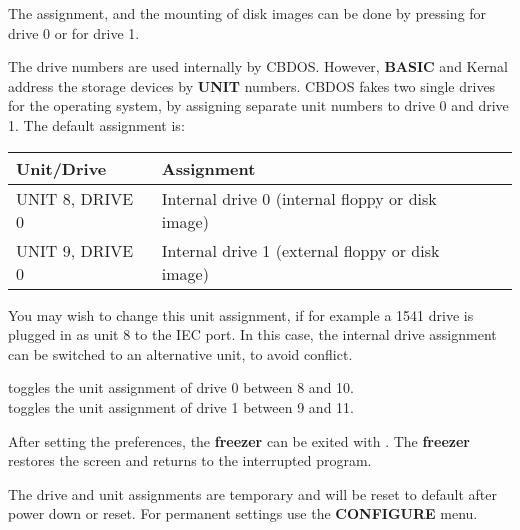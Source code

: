 The assignment, and the mounting of disk images can be done by pressing
 for drive 0 or  for drive 1.

The drive numbers are used internally by CBDOS. However, {\bf BASIC} and Kernal
address the storage devices by {\bf UNIT} numbers.
CBDOS fakes two single drives for the
operating system, by assigning separate unit numbers to drive 0 and drive 1.
The default assignment is:

\begin{center}
\begin{tabular}{|l|l|l|}
\hline
{\bf Unit/Drive} & {\bf Assignment} \\
\hline
UNIT 8, DRIVE 0  & Internal drive 0 (internal floppy or disk image) \\
UNIT 9, DRIVE 0} & Internal drive 1 (external floppy or disk image) \\
\hline
\end{tabular}
\end{center}


You may wish to change this unit assignment, if for example
a 1541 drive is plugged in as unit 8 to the IEC port.
In this case, the internal drive assignment can be switched to an alternative unit,
to avoid conflict.

 toggles the unit assignment of drive 0 between 8 and 10. \\
 toggles the unit assignment of drive 1 between 9 and 11.

After setting the preferences, the {\bf freezer} can be exited
with . The {\bf freezer} restores the screen and
returns to the interrupted program.

The drive and unit assignments are temporary and will be reset to default
after power down or reset. For permanent settings use the {\bf CONFIGURE}
menu.

